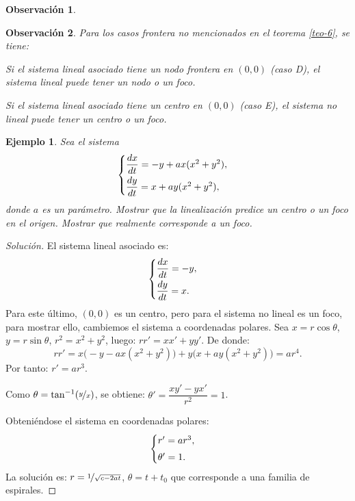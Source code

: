 \documentclass[a5paper,doc,10pt,noapacite]{apa6}
\newtheorem{observ}{Observación}
\newtheorem{ejem}{Ejemplo}
\begin{document}
{{\begin{observ}
\begin{figure}[H]
		\caption{ }
		\label{fig:M-19}
	\end{figure}
\end{observ}

\begin{observ}
Para los casos frontera no mencionados en el teorema \eqref{teo-6}, se tiene:
\begin{APAitemize}
	\item Si el sistema lineal asociado tiene un nodo frontera en \((0,0)\) (caso D), el sistema lineal puede tener
	un nodo o un foco.
	\item Si el sistema lineal asociado tiene un centro en \((0,0)\) (caso E), el sistema no lineal puede tener un
	centro o un foco.
\end{APAitemize}	
\end{observ}

\begin{ejem}
	Sea el sistema
	\[
	\begin{cases}
		\dfrac{dx}{dt}=-y+ax (x^2+y^2)  ,	\vspace{0.3em}
		\\
		\dfrac{dy}{dt}=x+ay(x^2+y^2),
	\end{cases}
	\]
	donde \(a\) es un parámetro. Mostrar que la linealización predice un centro o un foco en el origen. Mostrar que 	realmente corresponde a un foco.
\end{ejem}	
	\begin{proof}[Solución]
		El sistema lineal asociado es:
		\[
		\begin{cases}
		\dfrac{dx}{dt}=-y  ,	\vspace{0.3em}
		\\
		\dfrac{dy}{dt}=x.
	\end{cases}
		\]
		Para este último, \((0,0)\) es un centro, pero para el sistema no lineal es un foco, para mostrar ello, cambiemos el sistema a coordenadas polares. Sea \(x=r\cos\theta\), \(y=r\sin\theta\), \(r^2=x^2+y^2\), luego: \(rr'=xx'+yy'\). De donde:
		\[
		rr'=x\big(-y-ax(x^2+y^2)\big)+y\big(x+ay(x^2+y^2)\big)=ar^4.
		\]
		Por tanto: \(r'=ar^3\).
		
		Como \(\theta=\tan^{-1}(\nicefrac{y}{x})\), se obtiene: \(\theta'=\dfrac{xy'-yx'}{r^2}=1\).
		
		Obteniéndose el sistema en coordenadas polares:
		\[
		\begin{cases}
		r' = a r^3  ,	\vspace{0.3em}
		\\
		\theta' = 1.
		\end{cases}
		\]
		La solución es: \(r=\nicefrac{1}{\sqrt{c-2at}}\), \(\theta=t+t_0\) que corresponde a una familia de espirales.
		

\end{proof}}}
\end{document}
